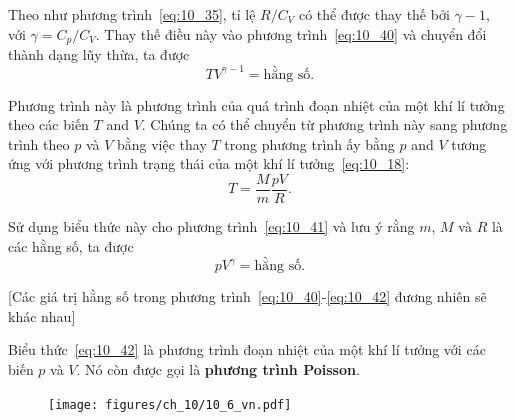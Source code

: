 Theo như phương trình~\eqref{eq:10_35}, tỉ lệ $R/C_V$ có thể được thay thế bởi $\gamma - 1$, với $\gamma=C_p/C_V$. Thay thế điều này vào phương trình~\eqref{eq:10_40} và chuyển đổi thành dạng lũy thừa, ta được  
\begin{equation}\label{eq:10_41}
	T V^{\gamma - 1} = \text{hằng số}.
\end{equation}


Phương trình này là phương trình của quá trình đoạn nhiệt của một khí lí tưởng theo các biến $T$ and $V$. Chúng ta có thể chuyển từ phương trình này sang phương trình theo $p$ và $V$ bằng việc thay $T$ trong phương trình ấy bằng $p$ and $V$ tương ứng với phương trình trạng thái của một khí lí tưởng~\eqref{eq:10_18}: 
\begin{equation*}
	T = \frac{M}{m}\frac{pV}{R}.
\end{equation*}

\noindent

Sử dụng biểu thức này cho phương trình~\eqref{eq:10_41} và lưu ý rằng $m$, $M$ và $R$ là các hằng số, ta được  
\begin{equation}\label{eq:10_42}
	p V^{\gamma} = \text{hằng số}.
\end{equation}

\noindent

[Các giá trị hằng số trong phương trình~\eqref{eq:10_40}-\eqref{eq:10_42} đương nhiên sẽ khác nhau] 


Biểu thức~\eqref{eq:10_42} là phương trình đoạn nhiệt của một khí lí tưởng với các biến $p$ và $V$. Nó còn được gọi là \textbf{phương trình Poisson}.

\begin{figure}[!htb]
	\begin{center}
		\texttt{[image: figures/ch\_10/10\_6\_vn.pdf]}
		\caption[]{}
		\label{fig:10_6}
	\end{center}
\end{figure}

